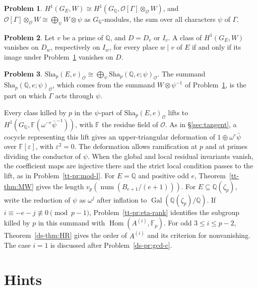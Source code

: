 \documentclass[reqno]{amsart}
\theoremstyle{definition}
\newtheorem{problem}{Problem}[section]
\theoremstyle{plain}
\newcommand{\Q}{\mathbb{Q}}
\newcommand{\F}{\mathbb{F}}
\newcommand{\Oc}{\mathcal{O}}
\newcommand{\Gal}{\operatorname{Gal}}
\newcommand{\Hom}{\operatorname{Hom}}
\newcommand{\num}{\operatorname{num}}
\newcommand{\Sha}{\mathrm{Sha}}
\begin{document}
\begin{problem}\label{pr:shapiro}
\(H^1(G_E, W) \cong H^1(G_\Q, \Oc[\Gamma] \otimes_\Oc W)\), and \(\Oc[\Gamma] \otimes_\Oc W \cong \bigoplus_\psi W \otimes \psi\) as \(G_\Q\)-modules, the sum over all characters \(\psi\) of \(\Gamma\).
\end{problem}

\begin{problem}\label{pr:mackey}
Let \(v\) be a prime of \(\Q\), and \(D = D_v\) or \(I_v\).  A class of \(H^1(G_E, W)\) vanishes on \(D_w\), respectively on \(I_w\), for every place \(w \mid v\) of \(E\) if and only if its image under Problem~\ref{pr:shapiro} vanishes on \(D\).
\end{problem}

\begin{problem}\label{pr:sha-decomp}
\(\Sha_p(E, e)_\Oc \cong \bigoplus_\psi \Sha_p(\Q, e; \psi)_\Oc\).  The summand \(\Sha_p(\Q, e; \psi)_\Oc\), which comes from the summand \(W \otimes \psi^{-1}\) of Problem~\ref{pr:shapiro}, is the part on which \(\Gamma\) acts through \(\psi\).
\end{problem}

Every class killed by \(p\) in the \(\psi\)-part of \(\Sha_p(E, e)_\Oc\) lifts to \(H^1(G_\Q, \F(\omega^{-e}\bar\psi^{-1}))\), with \(\F\) the residue field of \(\Oc\).  As in \S\ref{sec:tangent}, a cocycle representing this lift gives an upper-triangular deformation of \(1\oplus\omega^e\bar\psi\) over \(\F[\varepsilon]\), with \(\varepsilon^2=0\).  The deformation allows ramification at \(p\) and at primes dividing the conductor of \(\psi\).  When the global and local residual invariants vanish, the coefficient maps are injective there and the strict local condition passes to the lift, as in Problem~\ref{tt-pr:mod-l}.  For \(E=\Q\) and positive odd \(e\), Theorem~\ref{tt-thm:MW} gives the length \(v_p(\num(B_{e+1}/(e+1)))\).  For \(E\subseteq\Q(\zeta_p)\), write the reduction of \(\psi\) as \(\omega^j\) after inflation to \(\Gal(\Q(\zeta_p)/\Q)\).  If \(i\equiv-e-j\not\equiv0\pmod{p-1}\), Problem~\ref{tt-pr:eta-rank} identifies the subgroup killed by \(p\) in this summand with \(\Hom(A^{(i)},\F_p)\).  For odd \(3\le i\le p-2\), Theorem~\ref{ds-thm:HR} gives the order of \(A^{(i)}\) and its criterion for nonvanishing.  The case \(i=1\) is discussed after Problem~\ref{ds-pr:gcd-c}.

\section*{Hints}
\end{document}
